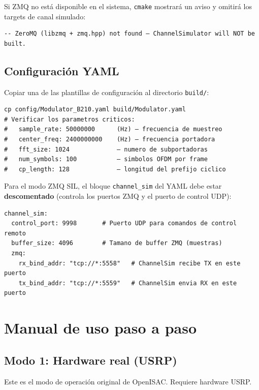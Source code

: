 \documentclass[11pt,a4paper]{article}
\begin{document}
Si ZMQ no está disponible en el sistema, \texttt{cmake} mostrará un aviso y
omitirá los targets de canal simulado:
\begin{lstlisting}[style=plain]
-- ZeroMQ (libzmq + zmq.hpp) not found — ChannelSimulator will NOT be built.
\end{lstlisting}

\subsection{Configuración YAML}

Copiar una de las plantillas de configuración al directorio \texttt{build/}:

\begin{lstlisting}[style=bash]
cp config/Modulator_B210.yaml build/Modulator.yaml
# Verificar los parametros criticos:
#   sample_rate: 50000000      (Hz) — frecuencia de muestreo
#   center_freq: 2400000000    (Hz) — frecuencia portadora
#   fft_size: 1024             — numero de subportadoras
#   num_symbols: 100           — simbolos OFDM por frame
#   cp_length: 128             — longitud del prefijo ciclico
\end{lstlisting}

Para el modo ZMQ SIL, el bloque \texttt{channel\_sim} del YAML debe estar
\textbf{descomentado} (controla los puertos ZMQ y el puerto de control UDP):

\begin{lstlisting}[style=plain, caption={Bloque channel\_sim en Modulator.yaml}]
channel_sim:
  control_port: 9998       # Puerto UDP para comandos de control remoto
  buffer_size: 4096        # Tamano de buffer ZMQ (muestras)
  zmq:
    rx_bind_addr: "tcp://*:5558"   # ChannelSim recibe TX en este puerto
    tx_bind_addr: "tcp://*:5559"   # ChannelSim envia RX en este puerto
\end{lstlisting}

\section{Manual de uso paso a paso}

\subsection{Modo 1: Hardware real (USRP)}
\label{sec:modo_hardware}

Este es el modo de operación original de OpenISAC. Requiere hardware USRP.
\end{document}
